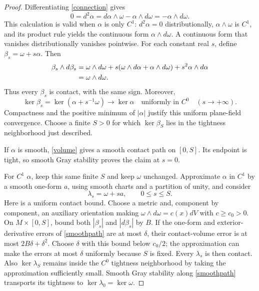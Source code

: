 \documentclass[11pt]{article}
\begin{document}
\begin{proof}
Differentiating \eqref{connection} gives
\begin{equation}
0=d^2\alpha=d\alpha\wedge\omega-\alpha\wedge d\omega
=-\alpha\wedge d\omega.
\label{mixed}
\end{equation}
This calculation is valid when $\alpha$ is only $C^1$: $d^2\alpha=0$
distributionally, $\alpha\wedge\omega$ is $C^1$, and its product
rule yields the continuous form $\alpha\wedge d\omega$.
A continuous form that vanishes distributionally vanishes pointwise.
For each constant real $s$, define $\beta_s=\omega+s\alpha$. Then
\begin{align}
\beta_s\wedge d\beta_s
&=\omega\wedge d\omega
 +s(\omega\wedge d\alpha+\alpha\wedge d\omega)
 +s^2\alpha\wedge d\alpha \notag\\
&=\omega\wedge d\omega.\label{volume}
\end{align}
Thus every $\beta_s$ is contact, with the same sign. Moreover,
\begin{equation}
\ker\beta_s=\ker(\alpha+s^{-1}\omega)\longrightarrow
\ker\alpha\quad\text{uniformly in }C^0\quad(s\longrightarrow+\infty).
\label{limit}
\end{equation}
Compactness and the positive minimum of $|\alpha|$ justify this
uniform plane-field convergence. Choose a finite $S>0$ for which
$\ker\beta_S$ lies in the tightness neighborhood just described.

If $\alpha$ is smooth, \eqref{volume} gives a smooth contact path on
$[0,S]$. Its endpoint is tight, so smooth Gray stability proves the
claim at $s=0$.

For $C^1$ $\alpha$, keep this same finite $S$ and keep $\omega$
unchanged. Approximate $\alpha$ in $C^1$ by a smooth one-form $a$,
using smooth charts and a partition of unity, and consider
\begin{equation}
\lambda_s=\omega+s a,\qquad 0\le s\le S.
\label{smoothpath}
\end{equation}
Here is a uniform contact bound. Choose a metric and, component by
component, an auxiliary orientation making
$\omega\wedge d\omega=c(x)dV$ with $c\ge c_0>0$.
On $M\times[0,S]$, bound both $|\beta_s|$ and $|d\beta_s|$ by $B$.
If the one-form and exterior-derivative errors of \eqref{smoothpath}
are at most $\delta$, their contact-volume error is at most
$2B\delta+\delta^2$. Choose $\delta$ with this bound below $c_0/2$;
the approximation can make the errors at most $\delta$ uniformly
because $S$ is fixed. Every $\lambda_s$ is then contact.
Also $\ker\lambda_S$ remains inside the $C^0$ tightness neighborhood
by taking the approximation sufficiently small. Smooth Gray stability
along \eqref{smoothpath} transports its tightness to
$\ker\lambda_0=\ker\omega$.
\end{proof}
\end{document}
